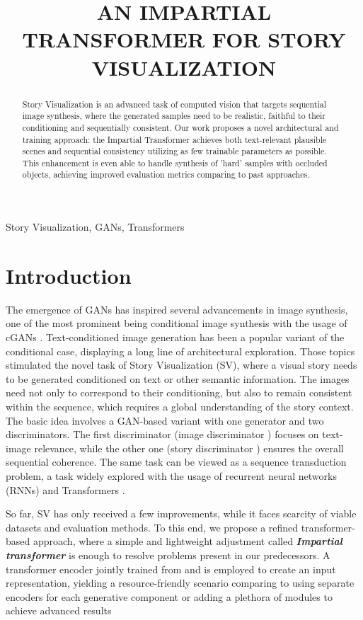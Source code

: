 \documentclass{article}
\title{AN IMPARTIAL TRANSFORMER FOR STORY VISUALIZATION}
\begin{document}
\maketitle
\begin{abstract}
Story Visualization is an advanced task of computed vision that targets sequential image synthesis, where the generated samples need to be realistic, faithful to their conditioning and sequentially consistent. Our work proposes a novel architectural and training approach: the Impartial Transformer achieves both text-relevant plausible scenes and sequential consistency utilizing as few trainable parameters as possible. This enhancement is even able to handle synthesis of 'hard' samples with occluded objects, achieving improved evaluation metrics comparing to past approaches.
\end{abstract}
\begin{keywords}
Story Visualization, GANs, Transformers
\end{keywords}
\section{Introduction}
\label{sec:intro}
The emergence of GANs \cite{goodfellow2014gans} has inspired several advancements in image synthesis, one of the most prominent being conditional image synthesis with the usage of cGANs \cite{odena2017conditional}. Text-conditioned image generation has been a popular variant of the conditional case, displaying a long line of architectural exploration. Those topics stimulated the novel task of Story Visualization (SV), where a visual story needs to be generated conditioned on text or other semantic information. The
images need not only to correspond to their conditioning,
but also to remain consistent within the sequence, which requires a global understanding of the story context. The basic idea involves a GAN-based variant with one generator  and two discriminators. The first discriminator (image discriminator ) focuses on text-image relevance, while the other one (story discriminator ) ensures the overall sequential coherence. The same task can be viewed as a sequence transduction problem, a task widely explored with the usage of recurrent neural networks (RNNs) and Transformers \cite{transformer}.

So far, SV has only received a few improvements, while it faces  scarcity of viable datasets and evaluation methods. To this end, we propose a refined transformer-based approach, where a simple and lightweight adjustment called \textbf{\textit{Impartial transformer}}  is enough to resolve problems present in our predecessors. A transformer encoder jointly trained from  and  is employed to create an input representation, yielding a resource-friendly scenario comparing to using separate encoders for each generative component or adding a plethora of modules \cite{Maharana2021ImprovingGA, Maharana2021IntegratingVL} to achieve advanced results
\end{document}
